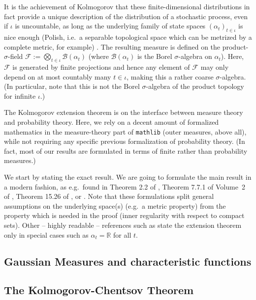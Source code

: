 \documentclass[lean]{DraftAFM}
\begin{document}
It is the achievement of Kolmogorov that these finite-dimensional distributions in fact provide a unique description of the distribution of a stochastic process, even if $\iota$ is uncountable, as long as the underlying family of state spaces $(\alpha_t)_{t\in\iota}$ is nice enough (Polish, i.e.\ a separable topological space which can be metrized by a complete metric, for example) \cite{kolmogoroff1933grundbegriffe}.
The resulting measure is defined on the product-$\sigma$-field $\mathcal F :=\bigotimes_{t\in\iota} \mathcal B(\alpha_t)$ (where $\mathcal B(\alpha_t)$ is the Borel $\sigma$-algebra on $\alpha_t$). Here, $\mathcal F$ is generated by finite projections and hence any element of $\mathcal F$ may only depend on at most countably many $t\in \iota$, making this a rather coarse $\sigma$-algebra. (In particular, note that this is not the Borel $\sigma$-algebra of the product topology for infinite $\iota$.)

The Kolmogorov extension theorem is on the interface between measure theory and probability theory. Here, we rely on a decent amount of formalized mathematics in the measure-theory part of {\tt mathlib} (outer measures, above all), while not requiring any specific previous formalization of probability theory. (In fact, most of our results are formulated in terms of finite rather than probability measures.)

We start by stating the exact result. We are going to formulate the main result in a modern fashion, as e.g.\ found in Theorem 2.2 of \cite{rao1971projective}, Theorem 7.7.1 of Volume~2 of \cite{bogachev2007measure}, Theorem 15.26 of \cite{guide2006infinite}, or \cite{border1998expository}. Note that these formulations split general assumptions on the underlying space(s) (e.g.\ a metric property) from the property which is needed in the proof (inner regularity with respect to compact sets). Other -- highly readable -- references such as \cite{Billingsley1995} state the extension theorem only in special cases such as $\alpha_t = \mathbb R$ for all $t$.


\subsection{Gaussian Measures and characteristic functions}
\cite{hairer2009introduction}

\subsection{The Kolmogorov-Chentsov Theorem}
\cite{kratschmer2023kolmogorov}
\cite{talagrand2022upper}
\end{document}
